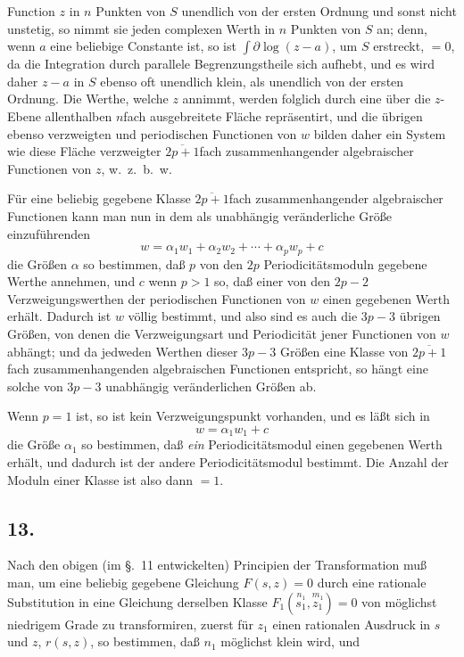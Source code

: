 \documentclass{article}
\begin{document}
Function $z$ in $n$ Punkten von $S$ unendlich von der ersten Ordnung und sonst nicht unstetig, so nimmt sie jeden complexen Werth in $n$ Punkten von $S$ an; denn, wenn $a$ eine beliebige Constante ist, so ist $\displaystyle\int \partial \log(z-a)$, um $S$ erstreckt, $= 0$, da die Integration durch parallele Begrenzungstheile sich aufhebt, und es wird daher $z-a$ in $S$ ebenso oft unendlich klein, als unendlich von der ersten Ordnung. Die Werthe, welche $z$ annimmt, werden folglich durch eine über die $z$-Ebene allenthalben $n$fach ausgebreitete Fläche repräsentirt, und die übrigen ebenso verzweigten und periodischen Functionen von $w$ bilden daher ein System wie diese Fläche verzweigter $\overline{2p+1}$fach zusammenhangender algebraischer Functionen von $z$, w.~z.~b.~w.

Für eine beliebig gegebene Klasse $\overline{2p+1}$fach zusammenhangender algebraischer Functionen kann man nun in dem als unabhängig veränderliche Größe einzuführenden
\[ w = \alpha_{1} w_{1} + \alpha_{2} w_{2} + \cdots + \alpha_{p} w_{p} + c \]
die Größen $\alpha$ so bestimmen, daß $p$ von den $2p$ Periodicitätsmoduln gegebene Werthe annehmen, und $c$ wenn $p > 1$ so, daß einer von den $2p-2$ Verzweigungswerthen der periodischen Functionen von $w$ einen gegebenen Werth erhält. Dadurch ist $w$ völlig bestimmt, und also sind es auch die $3p-3$ übrigen Größen, von denen die Verzweigungsart und Periodicität jener Functionen von $w$ abhängt; und da jedweden Werthen dieser $3p-3$ Größen eine Klasse von $\overline{2p+1}$fach zusammenhangenden algebraischen Functionen entspricht, so hängt eine solche von $3p-3$ unabhängig veränderlichen Größen ab.

Wenn $p = 1$ ist, so ist kein Verzweigungspunkt vorhanden, und es läßt sich in
\[ w = \alpha_{1} w_{1} + c \]
die Größe $\alpha_{1}$ so bestimmen, daß \emph{ein} Periodicitätsmodul einen gegebenen Werth erhält, und dadurch ist der andere Periodicitätsmodul bestimmt. Die Anzahl der Moduln einer Klasse ist also dann $= 1$.

\subsection*{13.}

Nach den obigen (im §.~11 entwickelten) Principien der Transformation muß man, um eine beliebig gegebene Gleichung $F(s, z) = 0$ durch eine rationale Substitution in eine Gleichung derselben Klasse $F_{1}(\overset{n_{1}}{s_{1}}, \overset{m_{1}}{z_{1}}) = 0$ von möglichst niedrigem Grade zu transformiren, zuerst für $z_{1}$ einen rationalen Ausdruck in $s$ und $z$, $r(s, z)$, so bestimmen, daß $n_{1}$ möglichst klein wird, und
\end{document}
